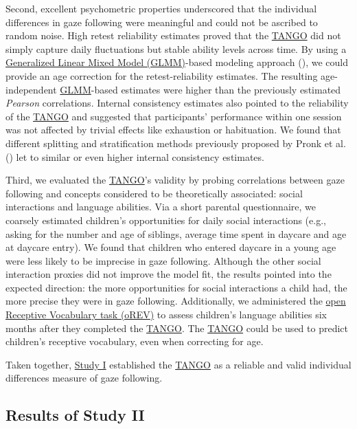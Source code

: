 \documentclass[
]{scrbook}
\begin{document}
Second, excellent psychometric properties underscored that the individual differences in gaze following were meaningful and could not be ascribed to random noise. High retest reliability estimates proved that the \hyperref[acronyms_TANGO]{TANGO} did not simply capture daily fluctuations but stable ability levels across time. By using a \hyperref[acronyms_GLMM]{Generalized Linear Mixed Model (GLMM)}-based modeling approach (), we could provide an age correction for the retest-reliability estimates. The resulting age-independent \hyperref[acronyms_GLMM]{GLMM}-based estimates were higher than the previously estimated \emph{Pearson} correlations. Internal consistency estimates also pointed to the reliability of the \hyperref[acronyms_TANGO]{TANGO} and suggested that participants' performance within one session was not affected by trivial effects like exhaustion or habituation. We found that different splitting and stratification methods previously proposed by Pronk et al. () let to similar or even higher internal consistency estimates.

Third, we evaluated the \hyperref[acronyms_TANGO]{TANGO}'s validity by probing correlations between gaze following and concepts considered to be theoretically associated: social interactions and language abilities. Via a short parental questionnaire, we coarsely estimated children's opportunities for daily social interactions (e.g., asking for the number and age of siblings, average time spent in daycare and age at daycare entry). We found that children who entered daycare in a young age were less likely to be imprecise in gaze following. Although the other social interaction proxies did not improve the model fit, the results pointed into the expected direction: the more opportunities for social interactions a child had, the more precise they were in gaze following. Additionally, we administered the \hyperref[acronyms_oREV]{open Receptive Vocabulary task (oREV)} to assess children's language abilities six months after they completed the \hyperref[acronyms_TANGO]{TANGO}. The \hyperref[acronyms_TANGO]{TANGO} could be used to predict children's receptive vocabulary, even when correcting for age.

Taken together, \hyperref[studyI]{Study I} established the \hyperref[acronyms_TANGO]{TANGO} as a reliable and valid individual differences measure of gaze following.

\subsection{Results of Study II}\label{resultsII}
\end{document}
